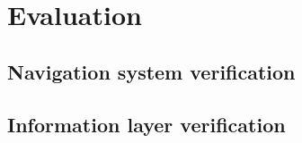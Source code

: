 \chapter{Evaluation}
\label{cha:evaluation}
\section{Navigation system verification}

\section{Information layer verification}